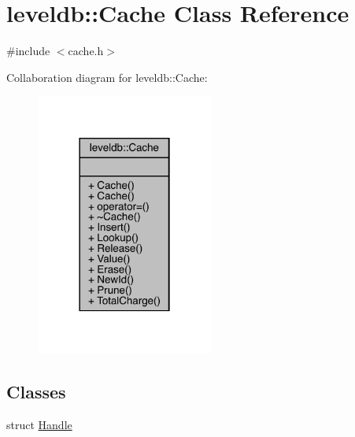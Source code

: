 \hypertarget{classleveldb_1_1_cache}{}\section{leveldb\+::Cache Class Reference}
\label{classleveldb_1_1_cache}


{\ttfamily \#include $<$cache.\+h$>$}



Collaboration diagram for leveldb\+::Cache\+:
\nopagebreak
\begin{figure}[H]
\begin{center}
\leavevmode
\includegraphics[width=165pt]{classleveldb_1_1_cache__coll__graph}
\end{center}
\end{figure}
\subsection*{Classes}
\begin{DoxyCompactItemize}
\item 
struct \mbox{\hyperlink{structleveldb_1_1_cache_1_1_handle}{Handle}}
\end{DoxyCompactItemize}
